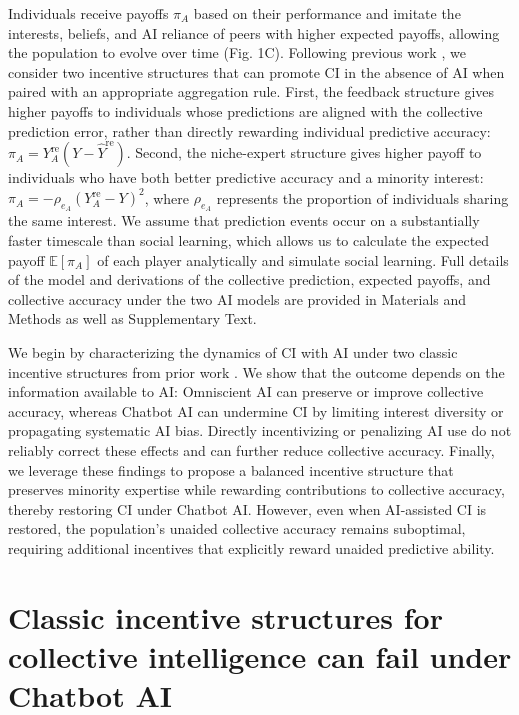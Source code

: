 \documentclass[12pt]{article}
\begin{document}
Individuals receive payoffs $\pi_A$ based on their performance and imitate the interests, beliefs, and AI reliance of peers with higher expected payoffs, allowing the population to evolve over time (Fig. 1C).
Following previous work \citep{wang2025individual}, we consider two incentive structures that can promote CI in the absence of AI when paired with an appropriate aggregation rule.
First, the feedback structure gives higher payoffs to individuals whose predictions are aligned with the collective prediction error, rather than directly rewarding individual predictive accuracy: $\pi_A = Y_A^{\mathrm{re}}(Y-\hat{Y}^{\mathrm{re}})$.
Second, the niche-expert structure gives higher payoff to individuals who have both better predictive accuracy and a minority interest: $\pi_A = -\rho_{e_A}(Y_A^{\mathrm{re}}-Y)^2$, where $\rho_{e_A}$ represents the proportion of individuals sharing the same interest.
We assume that prediction events occur on a substantially faster timescale than social learning, which allows us to calculate the expected payoff $\mathbb{E}[\pi_A]$ of each player analytically and simulate social learning.
Full details of the model and derivations of the collective prediction, expected payoffs, and collective accuracy under the two AI models are provided in Materials and Methods as well as Supplementary Text.

We begin by characterizing the dynamics of CI with AI under two classic incentive structures from prior work \citep{wang2025individual}.
We show that the outcome depends on the information available to AI: Omniscient AI can preserve or improve collective accuracy, whereas Chatbot AI can undermine CI by limiting interest diversity or propagating systematic AI bias.
Directly incentivizing or penalizing AI use do not reliably correct these effects and can further reduce collective accuracy.
Finally, we leverage these findings to propose a balanced incentive structure that preserves minority expertise while rewarding contributions to collective accuracy, thereby restoring CI under Chatbot AI. 
However, even when AI-assisted CI is restored, the population's unaided collective accuracy remains suboptimal, requiring additional incentives that explicitly reward unaided predictive ability.

\section*{Classic incentive structures for collective intelligence can fail under Chatbot AI}
\end{document}
